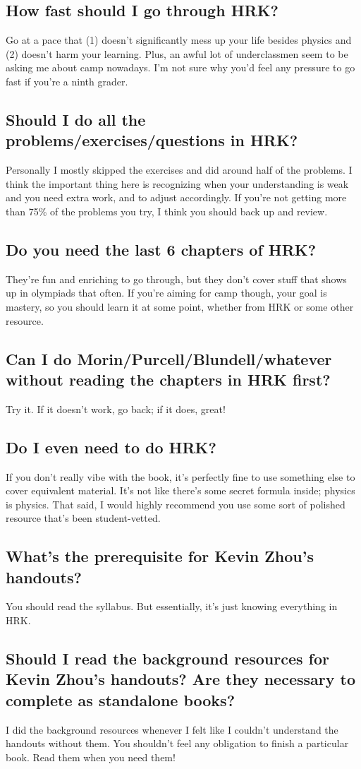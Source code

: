 \documentclass[11pt]{article}
\begin{document}
\subsection*{How fast should I go through HRK?}
Go at a pace that (1) doesn’t significantly mess up your life besides physics and (2) doesn’t harm your learning. Plus, an awful lot of underclassmen seem to be asking me about camp nowadays. I'm not sure why you'd feel any pressure to go fast if you're a ninth grader.
\subsection*{Should I do all the problems/exercises/questions in HRK?}
Personally I mostly skipped the exercises and did around half of the problems. I think the important thing here is recognizing when your understanding is weak and you need extra work, and to adjust accordingly. If you’re not getting more than 75\% of the problems you try, I think you should back up and review.
\subsection*{Do you need the last 6 chapters of HRK?}
They’re fun and enriching to go through, but they don’t cover stuff that shows up in olympiads that often. If you’re aiming for camp though, your goal is mastery, so you should learn it at some point, whether from HRK or some other resource.
\subsection*{Can I do Morin/Purcell/Blundell/whatever without reading the chapters in HRK first?}
Try it. If it doesn’t work, go back; if it does, great!
\subsection*{Do I even need to do HRK?}
If you don’t really vibe with the book, it’s perfectly fine to use something else to cover equivalent material. It’s not like there’s some secret formula inside; physics is physics. That said, I would highly recommend you use some sort of polished resource that’s been student-vetted.
\subsection*{What’s the prerequisite for Kevin Zhou’s handouts?}
You should read the syllabus. But essentially, it’s just knowing everything in HRK.
\subsection*{Should I read the background resources for Kevin Zhou’s handouts? Are they necessary to complete as standalone books?}
I did the background resources whenever I felt like I couldn’t understand the handouts without them. You shouldn’t feel any obligation to finish a particular book. Read them when you need them!
\end{document}
